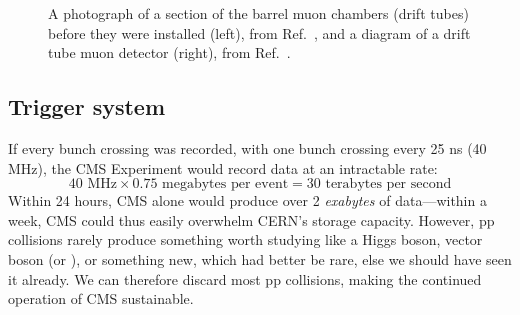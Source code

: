 \begin{figure}[htb]
    \centering
    \quad
    \caption[A photograph of a section of the barrel muon chambers and a diagram of a drift tube muon detector]{
        A photograph of a section of the barrel muon chambers (drift tubes) before they were installed (left), from Ref.~\cite{Hoch:1274451}, and a diagram of a drift tube muon detector (right), from Ref.~\cite{CMSWebMuonDT}. 
    }
    \label{fig:cms_muon_DT}
\end{figure}

\subsection{Trigger system}
If every bunch crossing was recorded, with one bunch crossing every 25 ns (40 MHz), the CMS Experiment would record data at an intractable rate:
\begin{equation}
40\text{ MHz} \times 0.75\text{ megabytes per event} = 30\text{ terabytes per second}
\end{equation}
Within 24 hours, CMS alone would produce over 2 \textit{exabytes} of data---within a week, CMS could thus easily overwhelm CERN's storage capacity. 
However, pp collisions rarely produce something worth studying like a Higgs boson, vector boson (\PW or \PZ), or something new, which had better be rare, else we should have seen it already. 
We can therefore discard most pp collisions, making the continued operation of CMS sustainable. 

